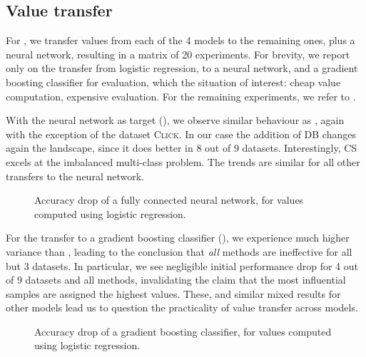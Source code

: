 \documentclass[10pt]{article}
\newcommand{\tmem}[1]{{\em #1\/}}
\newcommand{\tmname}[1]{\textsc{#1}}
\begin{document}
\subsection{Value transfer}\label{sec:value-transfer}

For , we transfer values from each of the 4
models to the remaining ones, plus a neural network, resulting in a matrix of
20 experiments. For brevity, we report only on the transfer from logistic
regression, to a neural network, and a gradient boosting classifier for
evaluation, which the situation of interest: cheap value computation,
expensive evaluation. For the remaining experiments, we refer to
.

With the neural network as target (), we observe
similar behaviour as {\cite{schoch_csshapley_2022}}, again with the exception
of the dataset {\tmname{Click}}. In our case the addition of DB changes again
the landscape, since it does better in 8 out of 9 datasets. Interestingly, CS
excels at the imbalanced multi-class problem. The trends are similar for all
other transfers to the neural network.

\begin{figure}[h]
  \caption{\label{fig:transfer-lr-mlp}Accuracy drop of a fully connected
  neural network, for values computed using logistic regression.}
\end{figure}

For the transfer to a gradient boosting classifier
(), we experience much higher variance than
{\cite{schoch_csshapley_2022}}, leading to the conclusion that {\tmem{all}}
methods are ineffective for all but 3 datasets. In particular, we see
negligible initial performance drop for 4 out of 9 datasets and all methods,
invalidating the claim that the most influential samples are assigned the
highest values. These, and similar mixed results for other models lead us to
question the practicality of value transfer across models.

\begin{figure}[h]
  \caption{\label{fig:transfer-lr-gb}Accuracy drop of a gradient boosting
  classifier, for values computed using logistic regression.}
\end{figure}
\end{document}
